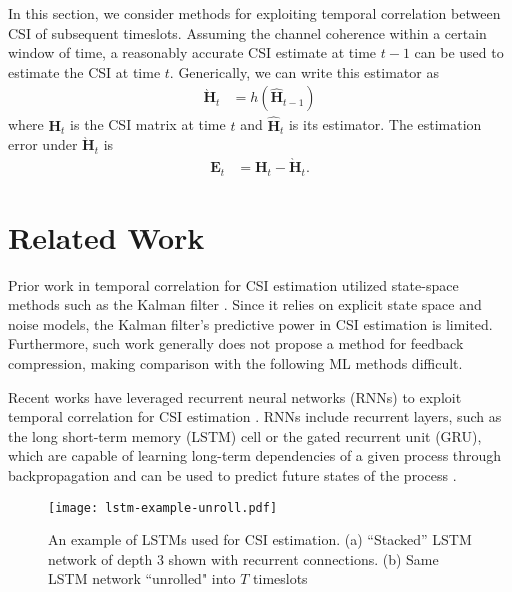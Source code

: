 In this section, we consider methods for exploiting temporal correlation between CSI of subsequent timeslots.
Assuming the channel coherence within a certain window of time,
a reasonably accurate CSI estimate at time $t-1$ can be used to estimate the CSI at time $t$.
Generically, we can write this estimator as
\begin{align}
\grave{\mathbf H}_t &= h(\hat{\mathbf H}_{t-1}) \label{eq:gen_estim}
\end{align}
where $\mathbf{H}_t$ is the CSI matrix at time $t$ and $\hat{\mathbf H}_t$ is its estimator. 
The estimation error under $\grave{\mathbf H}_t$ is
\begin{align}
\mathbf E_{t} &= \mathbf H_{t} - \grave{\mathbf H}_{t}. \label{eq:diff_err}
\end{align}

\section{Related Work}

Prior work in temporal correlation for CSI estimation utilized state-space methods such as the Kalman filter \cite{ref:Huber2006improved,ref:Ali2020BayesKalmanFilter,ref:Kim2021KalmanVsML}. Since it relies on explicit state space and noise models, the Kalman filter's predictive power in CSI estimation is limited. Furthermore, such work generally does not propose a method for feedback compression, making comparison with the following ML methods difficult.

Recent works have leveraged recurrent neural networks (RNNs) to exploit temporal correlation for CSI estimation \cite{ref:Lu2019RecCsiNet, ref:Liao2019BiLSTM, ref:Li2020SpatTempLSTM,
 ref:Jang2019Delay,ref:Wang2019CsiNetLSTM}. RNNs include recurrent layers, such as the long short-term memory (LSTM) cell or the gated recurrent unit (GRU), which are capable of learning long-term dependencies of a given process through backpropagation \cite{ref:Hermans2013Training} and can be used to predict future states of the process \cite{ref:Pascanu2014HowTo}.

\begin{figure}[htb]
	\centering
	\texttt{[image: lstm-example-unroll.pdf]}
	\medskip
	\caption{An example of LSTMs used for CSI estimation. (a) ``Stacked'' LSTM network of depth 3 shown with recurrent connections. (b) Same LSTM network ``unrolled" into $T$ timeslots }
	\label{fig:lstm_example}
\end{figure}

